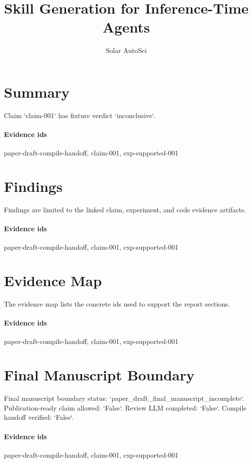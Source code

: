 \documentclass{article}
\title{Skill Generation for Inference-Time Agents}
\author{Solar AutoSci}
\date{}
\begin{document}
\maketitle

\section{Summary}
Claim `claim-001` has fixture verdict `inconclusive`.

\paragraph{Evidence ids} paper-draft-compile-handoff, claim-001, exp-supported-001

\section{Findings}
Findings are limited to the linked claim, experiment, and code evidence artifacts.

\paragraph{Evidence ids} paper-draft-compile-handoff, claim-001, exp-supported-001

\section{Evidence Map}
The evidence map lists the concrete ids used to support the report sections.

\paragraph{Evidence ids} paper-draft-compile-handoff, claim-001, exp-supported-001

\section{Final Manuscript Boundary}
Final manuscript boundary status: `paper\_draft\_final\_manuscript\_incomplete`. Publication-ready claim allowed: `False`. Review LLM completed: `False`. Compile handoff verified: `False`.

\paragraph{Evidence ids} paper-draft-compile-handoff, claim-001, exp-supported-001
\end{document}
